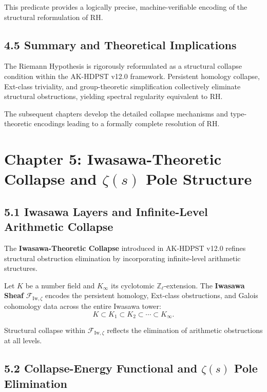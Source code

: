 \documentclass[11pt]{article}
\begin{document}
This predicate provides a logically precise, machine-verifiable encoding of the structural reformulation of RH.

\subsection*{4.5 Summary and Theoretical Implications}

The Riemann Hypothesis is rigorously reformulated as a structural collapse condition within the AK-HDPST v12.0 framework. Persistent homology collapse, Ext-class triviality, and group-theoretic simplification collectively eliminate structural obstructions, yielding spectral regularity equivalent to RH.

The subsequent chapters develop the detailed collapse mechanisms and type-theoretic encodings leading to a formally complete resolution of RH.



\section{Chapter 5: Iwasawa-Theoretic Collapse and $\zeta(s)$ Pole Structure}

\subsection*{5.1 Iwasawa Layers and Infinite-Level Arithmetic Collapse}

The \textbf{Iwasawa-Theoretic Collapse} introduced in AK-HDPST v12.0 refines structural obstruction elimination by incorporating infinite-level arithmetic structures.

Let $K$ be a number field and $K_\infty$ its cyclotomic $\mathbb{Z}_\ell$-extension. The \textbf{Iwasawa Sheaf} $\mathcal{F}_{\mathrm{Iw}, \zeta}$ encodes the persistent homology, Ext-class obstructions, and Galois cohomology data across the entire Iwasawa tower:
\[
K \subset K_1 \subset K_2 \subset \cdots \subset K_\infty.
\]

Structural collapse within $\mathcal{F}_{\mathrm{Iw}, \zeta}$ reflects the elimination of arithmetic obstructions at all levels.

\subsection*{5.2 Collapse-Energy Functional and $\zeta(s)$ Pole Elimination}
\end{document}
